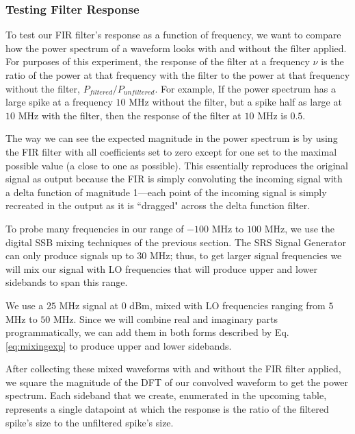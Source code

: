 \documentclass[12pt]{article}
\begin{document}
\subsubsection{Testing Filter Response}
To test our FIR filter's response as a function of frequency, we want to compare how the power spectrum of a waveform looks with and without the filter applied. For purposes of this experiment, the response of the filter at a frequency $\nu$ is the ratio of the power at that frequency with the filter to the power at that frequency without the filter, $P_{filtered}/P_{unfiltered}$. For example, If the power spectrum has a large spike at a frequency $10$ MHz without the filter, but a spike half as large at $10$ MHz with the filter, then the response of the filter at $10$ MHz is $0.5$. 

The way we can see the expected magnitude in the power spectrum is by using the FIR filter with all coefficients set to zero except for one set to the maximal possible value (a close to one as possible). This essentially reproduces the original signal as output because the FIR is simply convoluting the incoming signal with a delta function of magnitude 1---each point of the incoming signal is simply recreated in the output as it is ``dragged" across the delta function filter.

To probe many frequencies in our range of $-100$ MHz to $100$ MHz, we use the digital SSB mixing techniques of the previous section. The SRS Signal Generator can only produce signals up to $30$ MHz; thus, to get larger signal frequencies we will mix our signal with LO frequencies that will produce upper and lower sidebands to span this range.

We use a $25$ MHz signal at $0$ dBm, mixed with LO frequencies ranging from $5$ MHz to $50$ MHz. Since we will combine real and imaginary parts programmatically, we can add them in both forms described by Eq. \ref{eq:mixingexp} to produce upper and lower sidebands.

After collecting these mixed waveforms with and without the FIR filter applied, we square the magnitude of the DFT of our convolved waveform to get the power spectrum. Each sideband that we create, enumerated in the upcoming table, represents a single datapoint at which the response is the ratio of the filtered spike's size to the unfiltered spike's size.
\end{document}
